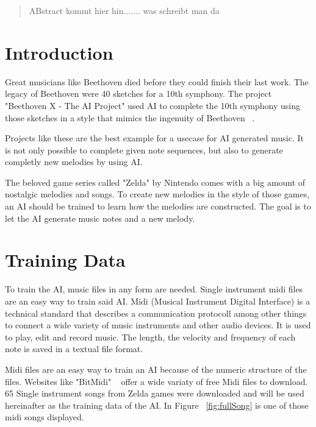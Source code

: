 \maketitle

\begin{abstract}
ABstract kommt hier hin....... was schreibt man da

\end{abstract}

\section{Introduction}
\label{intro}

Great musicians like Beethoven died before they could finish their last work. The legacy
of Beethoven were 40 sketches for a 10th symphony. The project "Beethoven X - The AI 
Project" used AI to complete the 10th symphony using those sketches in a style that
mimics the ingenuity of Beethoven ~\cite{test:1}.

Projects like these are the best example for a usecase for AI generated music. It is not
only possible to complete given note sequences, but also to generate completly new 
melodies by using AI.

The beloved game series called "Zelda" by Nintendo comes with a big amount of nostalgic
melodies and songs. To create new melodies in the style of those games, an AI should be
trained to learn how the melodies are constructed. The goal is to let the AI generate
music notes and a new melody.

\section{Training Data}
\label{trainingdata}

To train the AI, music files in any form are needed. Single instrument
midi files are an easy way to train said AI. Midi (Musical Instrument Digital
Interface) is a technical standard that describes a communication protocoll
among other things to connect a wide variety of music instruments and other
audio devices. It is used to play, edit and record music. The length, the
velocity and frequency of each note is saved in a textual file format.

Midi files are an easy way to train an AI because of the numeric structure
of the files. Websites like "BitMidi" ~\cite{test:2} offer a wide variaty 
of free Midi files to download. 65 Single instrument songs from Zelda games 
were downloaded and will be used hereinafter as the training data of the AI.
In Figure ~\ref{fig:fullSong} is one of those midi songs displayed.

